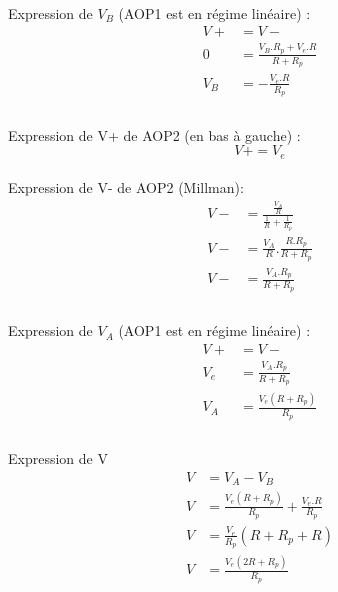 \documentclass{article}
\begin{document}
\paragraph{}Expression de $V_B$ (AOP1 est en régime linéaire) :
\begin{align*}
    V+ &= V-\\
    0 &= \frac{ V_B.R_p + V_e.R } { R + R_p }\\
    V_B &= -\frac{V_e.R}{R_p}\\
\end{align*}

\paragraph{}Expression de V+ de AOP2 (en bas à gauche) :
$$V+ = V_e$$

\paragraph{}Expression de V- de AOP2 (Millman):
\begin{align*}
    V- &= \frac{ \frac{V_A}{R} } { \frac{1}{R} + \frac{1}{R_p} }\\
    V- &= \frac{V_A}{R} . \frac{R.R_p}{R + R_p}\\
    V- &= \frac{V_A.R_p}{R + R_p}\\
\end{align*}

\paragraph{}Expression de $V_A$ (AOP1 est en régime linéaire) :
\begin{align*}
    V+ &= V-\\
    V_e &= \frac{V_A.R_p}{R + R_p}\\
    V_A &= \frac{V_e(R + R_p)}{R_p}\\
\end{align*}

\paragraph{}Expression de V
\begin{align*}
    V &= V_A - V_B\\
    V &= \frac{V_e(R + R_p)}{R_p} + \frac{V_e.R}{R_p} \\
    V &= \frac{V_e}{R_p} \left(R + R_p + R\right) \\
    V &= \frac{V_e(2R + R_p)}{R_p} \\
\end{align*}
\end{document}

